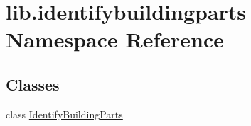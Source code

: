 \hypertarget{namespacelib_1_1identifybuildingparts}{\section{lib.\-identifybuildingparts Namespace Reference}
\label{namespacelib_1_1identifybuildingparts}
}
\subsection*{Classes}
\begin{DoxyCompactItemize}
\item 
class \hyperlink{classlib_1_1identifybuildingparts_1_1_identify_building_parts}{Identify\-Building\-Parts}
\end{DoxyCompactItemize}
